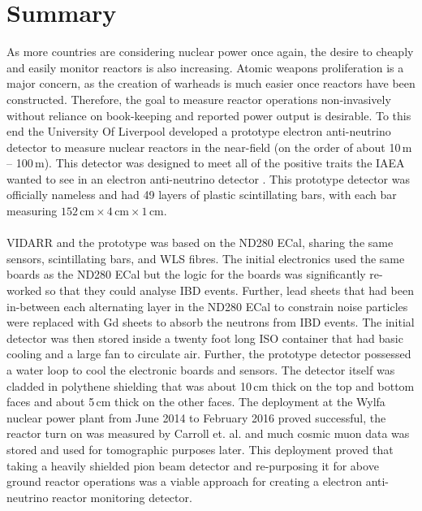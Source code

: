 
\chapter{Summary}

\ifpdf
    \graphicspath{{Chapter7/Figs/Raster/}{Chapter6/Figs/PDF/}{Chapter6/Figs/}}
\else
    \graphicspath{{Chapter7/Figs/Vector/}{Chapter7/Figs/}}
\fi

As more countries are considering nuclear power once again, the desire to cheaply and easily monitor reactors is also increasing. Atomic weapons proliferation is a major concern, as the creation of warheads is much easier once reactors have been constructed. Therefore, the goal to measure reactor operations non-invasively without reliance on book-keeping and reported power output is desirable. To this end the University Of Liverpool developed a prototype electron anti-neutrino detector to measure nuclear reactors in the near-field (on the order of about 10\,m -- 100\,m). This detector was designed to meet all of the positive traits the IAEA wanted to see in an electron anti-neutrino detector \cite{IAEA_2008}. This prototype detector was officially nameless and had 49 layers of plastic scintillating bars, with each bar measuring $152\,\textrm{cm} \times 4\,\textrm{cm} \times 1\,\textrm{cm}$.
\\\\VIDARR and the prototype was based on the ND280 ECal, sharing the same sensors, scintillating bars, and WLS fibres. The initial electronics used the same boards as the ND280 ECal but the logic for the boards was significantly re-worked so that they could analyse IBD events. Further, lead sheets that had been in-between each alternating layer in the ND280 ECal to constrain noise particles were replaced with Gd sheets to absorb the neutrons from IBD events. The initial detector was then stored inside a twenty foot long ISO container that had basic cooling and a large fan to circulate air. Further, the prototype detector possessed a water loop to cool the electronic boards and sensors. The detector itself was cladded in polythene shielding that was about 10\,cm thick on the top and bottom faces and about 5\,cm thick on the other faces. The deployment at the Wylfa nuclear power plant from June 2014 to February 2016 proved successful, the reactor turn on was measured by Carroll et. al. \cite{Carroll_2018} and much cosmic muon data was stored and used for tomographic purposes later. This deployment proved that taking a heavily shielded pion beam detector and re-purposing it for above ground reactor operations was a viable approach for creating a electron anti-neutrino reactor monitoring detector. 
